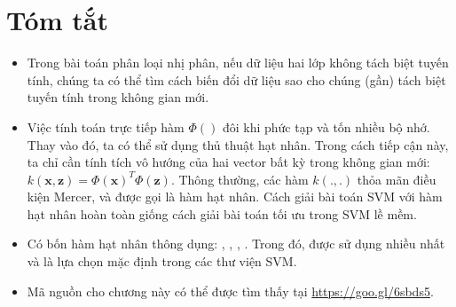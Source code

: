 \section{Tóm tắt }

\begin{itemize}
    \item Trong bài toán phân loại nhị phân, nếu dữ liệu hai lớp {không tách biệt tuyến tính}, chúng ta có thể tìm cách biến đổi dữ liệu sao cho chúng (gần) tách biệt tuyến tính trong không gian mới. 
     
    \item Việc tính toán trực tiếp hàm $\Phi()$ đôi khi phức tạp và tốn nhiều bộ nhớ. Thay vào đó, ta có thể sử dụng thủ thuật hạt nhân. Trong cách tiếp cận này, ta chỉ cần tính tích vô hướng của hai vector bất kỳ trong không gian mới: $k(\mathbf{x}, \mathbf{z}) = \Phi(\mathbf{x})^T\Phi(\mathbf{z})$. 
    Thông thường, các hàm $k(., .)$ thỏa mãn điều kiện Mercer, và được
    gọi là hàm hạt nhân. Cách giải bài toán SVM với hàm hạt nhân hoàn toàn giống cách giải bài toán tối ưu trong SVM lề mềm. 
     
    \item Có bốn hàm hạt nhân thông dụng: ,
    , , . Trong đó,  được sử dụng nhiều nhất và là lựa chọn mặc định trong các thư viện SVM.
     
    \item Mã nguồn cho chương này có thể được tìm thấy tại \url{https://goo.gl/6sbds5}.
     
\end{itemize}
 
 
 
 
 
 
